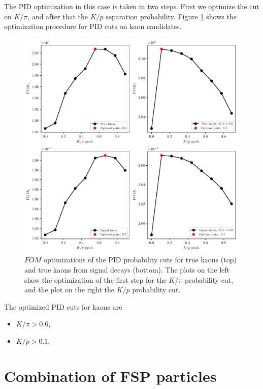 \documentclass[headings=standardclasses,headings=big,oneside,a4paper,openany,12pt]{scrbook}
\begin{document}
The PID optimization in this case is taken in two steps. First we optimize the cut on $K / \pi$, and after that the $K/p$ separation probability. Figure \ref{fig:Kfom} shows the optimization procedure for PID cuts on kaon candidates.

\begin{figure}[H]
\centering
\captionsetup{width=.8\linewidth}
\includegraphics[width=\linewidth]{fig/FSP_kaon_fom}
\caption{$FOM$ optimizations of the PID probability cuts for true kaons (top) and true kaons from signal decays (bottom). The plots on the left show the optimization of the first step for the $K / \pi$ probability cut, and the plot on the right the $K/p$ probability cut.}
\label{fig:Kfom}
\end{figure}

The optimized PID cuts for kaons are
\begin{itemize}
\item $K/\pi > 0.6$,
\item $K/p > 0.1$.
\end{itemize}

\section{Combination of FSP particles}
\end{document}
